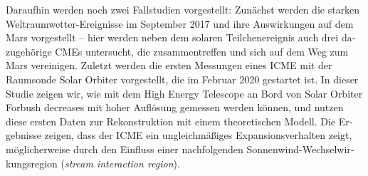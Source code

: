 \begin{otherlanguage}{ngerman}
Daraufhin werden noch zwei Fallstudien vorgestellt: Zunächst werden die starken Weltraumwetter-Ereignisse im September 2017 und ihre Auswirkungen auf dem Mars vorgestellt -- hier werden neben dem solaren Teilchenereignis auch drei dazugehörige \acp{CME} untersucht, die zusammentreffen und sich auf dem Weg zum Mars vereinigen. Zuletzt werden die ersten Messungen eines \ac{ICME} mit der Raumsonde Solar Orbiter vorgestellt, die im Februar 2020 gestartet ist. In dieser Studie zeigen wir, wie mit dem High Energy Telescope an Bord von Solar Orbiter Forbush decreases mit hoher Auflösung gemessen werden können, und nutzen diese ersten Daten zur Rekonstruktion mit einem theoretischen Modell. Die Ergebnisse zeigen, dass der \ac{ICME} ein ungleichmäßiges Expansionsverhalten zeigt, möglicherweise durch den Einfluss einer nachfolgenden Sonnenwind-Wechselwirkungsregion (\textit{stream interaction region}).
\end{otherlanguage}